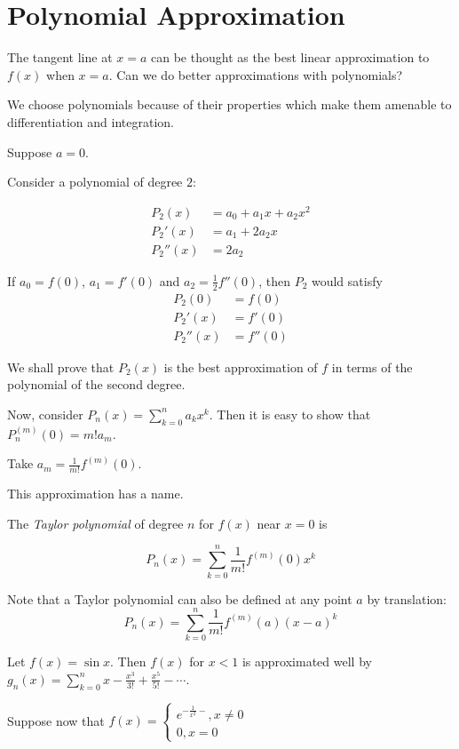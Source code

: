 \documentclass[11pt]{scrartcl}
\begin{document}
\section{Polynomial Approximation}

The tangent line at $x=a$ can be thought as the best linear
approximation to $f(x)$ when $x=a$. Can we do better approximations
with polynomials?

We choose polynomials because of their properties which make them
amenable to differentiation and integration.

Suppose $a=0$.

Consider a polynomial of degree $2$:

\begin{align}
  P_2(x) &= a_0 + a_1 x + a_2 x^2\\
  P_2'(x) &= a_1 + 2 a_2x\\
  P_2''(x) &= 2a_2
\end{align}

If $a_0=f(0)$, $a_1=f'(0)$ and $a_2 = \frac{1}{2}f''(0)$, then $P_2$ would satisfy
\begin{align}
  P_2(0) &= f(0)\\
  P_2'(x) &= f'(0)\\
  P_2''(x) &= f''(0)
\end{align}

We shall prove that $P_2(x)$ is the best approximation of $f$ in terms
of the polynomial of the second degree.


Now, consider $P_n(x)=\sum_{k=0}^n a_kx^k$. Then it is easy to show
that $P_n^{(m)}(0) = m! a_m$.

Take $a_m = \frac{1}{m!}f^{(m)}(0)$.

This approximation has a name.

\begin{definition}
  The \textit{Taylor polynomial} of degree $n$ for $f(x)$ near $x=0$ is

  \begin{equation*}
    P_n(x) = \sum_{k=0}^n \frac{1}{m!} f^{(m)}(0)x^k 
 \end{equation*}
\end{definition}

Note that a Taylor polynomial can also be defined at any point $a$ by translation:
  \begin{equation*}
    P_n(x) = \sum_{k=0}^n \frac{1}{m!} f^{(m)}(a)(x-a)^k
  \end{equation*}

  \begin{example}

Let $f(x) = \sin x$.  Then $f(x)$ for $x< 1$ is approximated well by $g_n(x) = \sum_{k=0}^n x-\frac{x^3}{3!}+\frac{x^5}{5!} -\cdots$.
\end{example}

Suppose now that $f(x) = \begin{cases}
  e^{-\frac{1}{x^2}-}, x\neq 0\\
  0, x = 0
\end{cases}$
\end{document}

